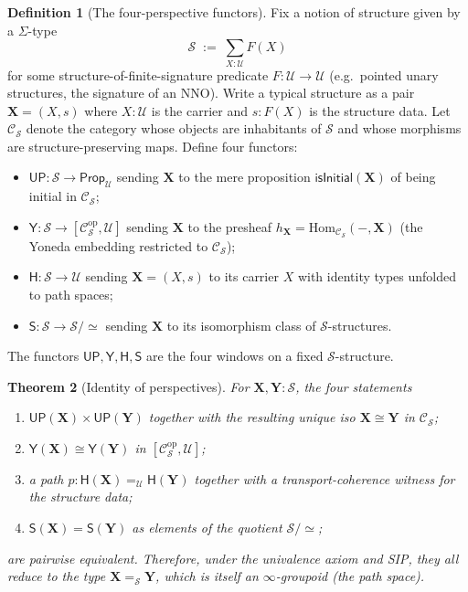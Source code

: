 \documentclass[12pt]{article}
\newtheorem{theorem}{Theorem}[section]
\theoremstyle{definition}
\newtheorem{definition}[theorem]{Definition}
\theoremstyle{remark}
\newcommand{\U}{\mathcal{U}}
\newcommand{\op}{^{\mathrm{op}}}
\newcommand{\Hom}{\mathrm{Hom}}
\newcommand{\eqv}{\simeq}
\newcommand{\iso}{\cong}
\begin{document}
\begin{definition}[The four-perspective functors]
\label{def:four-functors}
Fix a notion of structure given by a $\Sigma$-type
\[
\mathcal{S} \;:=\; \sum_{X : \U} F(X)
\]
for some structure-of-finite-signature predicate $F : \U \to \U$ (e.g.\
pointed unary structures, the signature of an NNO). Write a typical
structure as a pair $\mathbf{X} = (X, s)$ where $X : \U$ is the carrier
and $s : F(X)$ is the structure data. Let $\mathcal{C}_\mathcal{S}$
denote the category whose objects are inhabitants of $\mathcal{S}$ and
whose morphisms are structure-preserving maps. Define four functors:
\begin{itemize}
\item $\mathsf{UP}\colon \mathcal{S} \to \mathsf{Prop}_\U$ sending
$\mathbf{X}$ to the mere proposition $\mathsf{isInitial}(\mathbf{X})$ of
being initial in $\mathcal{C}_\mathcal{S}$;
\item $\mathsf{Y}\colon \mathcal{S} \to [\mathcal{C}_\mathcal{S}\op, \U]$
sending $\mathbf{X}$ to the presheaf
$h_{\mathbf{X}} = \Hom_{\mathcal{C}_\mathcal{S}}(-, \mathbf{X})$
(the Yoneda embedding restricted to $\mathcal{C}_\mathcal{S}$);
\item $\mathsf{H}\colon \mathcal{S} \to \U$ sending $\mathbf{X} = (X, s)$
to its carrier $X$ with identity types unfolded to path spaces;
\item $\mathsf{S}\colon \mathcal{S} \to \mathcal{S}/\eqv$ sending
$\mathbf{X}$ to its isomorphism class of $\mathcal{S}$-structures.
\end{itemize}
The functors $\mathsf{UP}, \mathsf{Y}, \mathsf{H}, \mathsf{S}$ are the
four windows on a fixed $\mathcal{S}$-structure.
\end{definition}

\begin{theorem}[Identity of perspectives]
\label{thm:identity-of-perspectives}
For $\mathbf{X}, \mathbf{Y} : \mathcal{S}$, the four statements
\begin{enumerate}
\item[(UP)] $\mathsf{UP}(\mathbf{X}) \times \mathsf{UP}(\mathbf{Y})$
together with the resulting unique iso $\mathbf{X} \iso \mathbf{Y}$ in
$\mathcal{C}_\mathcal{S}$;
\item[(Y)] $\mathsf{Y}(\mathbf{X}) \iso \mathsf{Y}(\mathbf{Y})$ in
$[\mathcal{C}_\mathcal{S}\op, \U]$;
\item[(H)] a path
$p\colon \mathsf{H}(\mathbf{X}) =_\U \mathsf{H}(\mathbf{Y})$ together
with a transport-coherence witness for the structure data;
\item[(S)] $\mathsf{S}(\mathbf{X}) = \mathsf{S}(\mathbf{Y})$ as elements
of the quotient $\mathcal{S}/\eqv$;
\end{enumerate}
are pairwise equivalent. Therefore, under the univalence axiom and SIP,
they all reduce to the type
$\mathbf{X} =_\mathcal{S} \mathbf{Y}$, which is itself an
$\infty$-groupoid (the path space).
\end{theorem}
\end{document}
